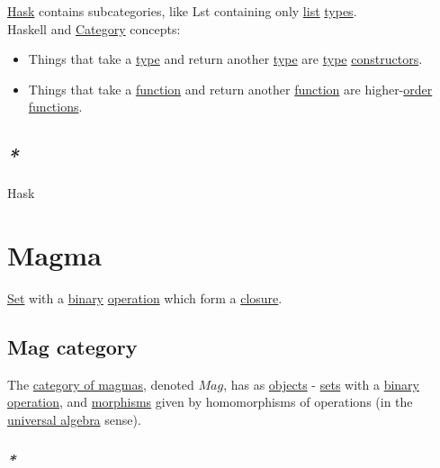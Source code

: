 \documentclass[a4paper,14pt,oneside]{book}
\begin{document}
{\hyperref[org9e6eb99]{Hask} contains subcategories, like Lst containing only \hyperref[org47d56c8]{list} \hyperref[org51532d9]{types}.\\

Haskell and \hyperref[orgf2b19ad]{Category} concepts:\\
\begin{itemize}
\item Things that take a \hyperref[orga9ca243]{type} and return another \hyperref[orga9ca243]{type} are \hyperref[orga9ca243]{type} \hyperref[org21599a8]{constructors}.\\
\item Things that take a \hyperref[org6a60524]{function} and return another \hyperref[org6a60524]{function} are higher-\hyperref[orgb3255b0]{order} \hyperref[orgf33f5fb]{functions}.\\
\end{itemize}

\subsection{\emph{*}}
\label{sec:orgda179b7}

\label{org9e6eb99}Hask\\

\section{\label{orgf909263}Magma}
\label{sec:orge86c9bb}
\hyperref[org0726f94]{Set} with a \hyperref[orge428263]{binary} \hyperref[org4cee8d5]{operation} which form a \hyperref[org06d2829]{closure}.\\

\subsection{\label{orgaf0c0c1}Mag category}
\label{sec:org1eedc15}
The \hyperref[org056dbca]{category of magmas}, denoted \(Mag\), has as \hyperref[org7c09bf4]{objects} - \hyperref[org732f054]{sets} with a \hyperref[orge428263]{binary} \hyperref[org4cee8d5]{operation}, and \hyperref[org43d1069]{morphisms} given by homomorphisms of operations (in the \hyperref[org55cd0bb]{universal algebra} sense).\\

\subsubsection{\emph{*}}
\label{sec:org55b7024}

}
\end{document}
